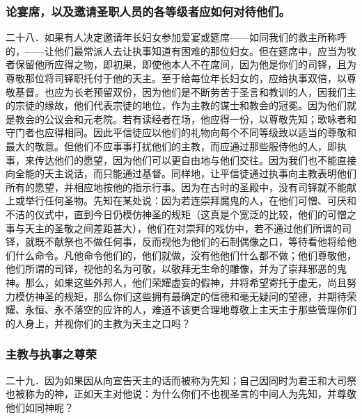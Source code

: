 
\subsubsection{论宴席，以及邀请圣职人员的各等级者应如何对待他们。}

二十八．如果有人决定邀请年长妇女参加爱宴或筵席——如同我们的救主所称呼的，——让他们最常派人去让执事知道有困难的那位妇女。但在筵席中，应当为牧者保留他所应得之物，即初果，即使他本人不在席间，因为他是你们的司铎，且为尊敬那位将司铎职托付于他的天主。至于给每位年长妇女的，应给执事双倍，以尊敬基督。也应为长老预留双份，因为他们是不断劳苦于圣言和教训的人，因我们主的宗徒的缘故，他们代表宗徒的地位，作为主教的谋士和教会的冠冕。因为他们就是教会的公议会和元老院。若有读经者在场，他应得一份，以尊敬先知；歌咏者和守门者也应得相同。因此平信徒应以他们的礼物向每个不同等级致以适当的尊敬和最大的敬意。但他们不应事事打扰他们的主教，而应通过那些服侍他的人，即执事，来传达他们的愿望，因为他们可以更自由地与他们交往。因为我们也不能直接向全能的天主说话，而只能通过基督。同样地，让平信徒通过执事向主教表明他们所有的愿望，并相应地按他的指示行事。因为在古时的圣殿中，没有司铎就不能献上或举行任何圣物。先知在某处说：因为若连崇拜魔鬼的人，在他们可憎、可厌和不洁的仪式中，直到今日仍模仿神圣的规矩（这真是个宽泛的比较，他们的可憎之事与天主的圣敬之间差距甚大），他们在对崇拜的戏仿中，若不通过他们所谓的司铎，就既不献祭也不做任何事，反而视他为他们的石制偶像之口，等待看他将给他们什么命令。凡他命令他们的，他们就做，没有他他们什么都不做；他们尊敬他，他们所谓的司铎，视他的名为可敬，以敬拜无生命的雕像，并为了崇拜邪恶的鬼神。那么，如果这些外邦人，他们荣耀虚妄的假神，并将希望寄托于虚无，尚且努力模仿神圣的规矩，那么你们这些拥有最确定的信德和毫无疑问的望德，并期待荣耀、永恒、永不落空的应许的人，难道不该更合理地尊敬上主天主于那些管理你们的人身上，并视你们的主教为天主之口吗？\par


\subsubsection{主教与执事之尊荣}

二十九．因为如果因从向宣告天主的话而被称为先知；自己因同时为君王和大司祭也被称为的神，正如天主对他说：为什么你们不也视圣言的中间人为先知，并尊敬他们如同神呢？\par

